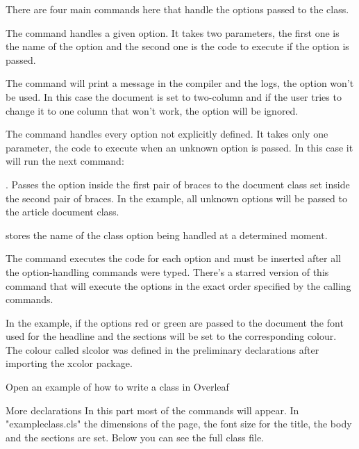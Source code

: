 \newcommand{\headlinecolor}{\normalcolor}
\RequirePackage{xcolor}

\DeclareOption{green}{\renewcommand{\headlinecolor}{\color{green}}}
\DeclareOption{red}{\renewcommand{\headlinecolor}{\color{slcolor}}}
\ProcessOptions\relax
{}
There are four main commands here that handle the options passed to the class.

The command \DeclareOption{}{} handles a given option. It takes two parameters, the first one is the name of the option and the second one is the code to execute if the option is passed.

The command \OptionNotUsed will print a message in the compiler and the logs, the option won't be used. In this case the document is set to two-column and if the user tries to change it to one column that won't work, the option will be ignored.

The command \Declareoption*{} handles every option not explicitly defined. It takes only one parameter, the code to execute when an unknown option is passed. In this case it will run the next command:

\PassOptionsToClass{}{}. Passes the option inside the first pair of braces to the document class set inside the second pair of braces. In the example, all unknown options will be passed to the article document class.

\CurrentOption stores the name of the class option being handled at a determined moment.

The command \ProcessOptions\relax executes the code for each option and must be inserted after all the option-handling commands were typed. There's a starred version of this command that will execute the options in the exact order specified by the calling commands.

In the example, if the options red or green are passed to the document the font used for the headline and the sections will be set to the corresponding colour. The colour called slcolor was defined in the preliminary declarations after importing the xcolor package.

 Open an example of how to write a class in Overleaf


More declarations
In this part most of the commands will appear. In "exampleclass.cls" the dimensions of the page, the font size for the title, the body and the sections are set. Below you can see the full class file.

